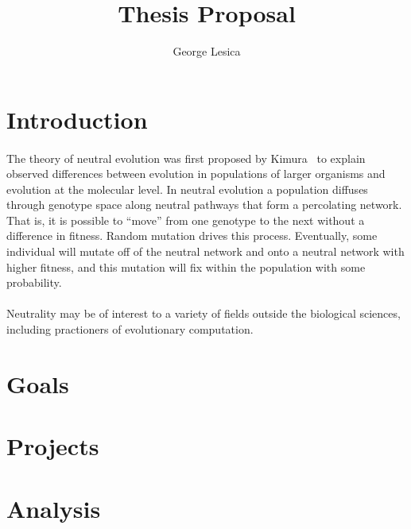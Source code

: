 \documentclass[12pt,letterpaper,titlepage,draft]{article}
\author{George Lesica}
\title{Thesis Proposal}
\begin{document}
\maketitle

\section{Introduction}

\paragraph{}
The theory of neutral evolution was first proposed by Kimura~\cite{Kimura1984}
to explain observed differences between evolution in populations of larger
organisms and evolution at the molecular level. In neutral evolution a
population diffuses through genotype space along neutral pathways that form a
percolating network. That is, it is possible to ``move'' from one genotype to
the next without a difference in fitness. Random mutation drives this process.
Eventually, some individual will mutate off of the neutral network and onto a
neutral network with higher fitness, and this mutation will fix within the
population with some probability.

\paragraph{}
Neutrality may be of interest to a variety of fields outside the biological
sciences, including practioners of evolutionary computation.

\section{Goals}

\section{Projects}

\section{Analysis}

{}

\end{document}
